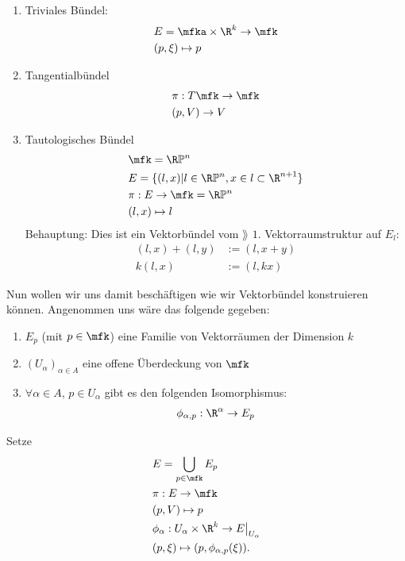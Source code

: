 \begin{bsp} \leavevmode
\begin{enumerate}
\item Triviales Bündel:
\begin{align}
&E = \mfka \times \R^k \to \mfk\\
&(p, \xi) \mapsto p
\end{align}
\item Tangentialbündel 
\begin{align}
&\pi: T\mfk \to \mfk\\
&(p, V) \to V
\end{align}
\item Tautologisches Bündel
\begin{align}
&\mfk = \R \mathbb{P}^n\\
&E = \{ (l, x) \vert l \in \R \mathbb{P}^n, x\in l \subset \R^{n+1} \}\\
&\pi: E \to \mfk = \R \mathbb{P}^n\\
&(l, x) \mapsto l
\end{align}
Behauptung: Dies ist ein Vektorbündel vom $\rang$ $1$.
Vektorraumstruktur auf $E_l$:
\begin{align}
(l, x) + (l, y) &:= (l, x + y)\\
k (l, x) &:= (l, k x)
\end{align}
\end{enumerate}
\end{bsp}
Nun wollen wir uns damit beschäftigen wie wir Vektorbündel konstruieren können.
Angenommen uns wäre das folgende gegeben:
\begin{enumerate}
\item $E_p$ (mit $p\in \mfk$) eine Familie von Vektorräumen der Dimension $k$
\item $(U_\alpha)_{\alpha \in A}$ eine offene Überdeckung von $\mfk$
\item $\forall \alpha \in A$, $p\in U_\alpha$ gibt es den folgenden Isomorphismus:
\begin{align}
\phi_{\alpha, p}: \R^\alpha \to E_p
\end{align}
\end{enumerate}
Setze 
\begin{align}
&E = \bigcup_{p \in \mfk} E_p\\
&\pi : E \to \mfk\\
&(p, V) \mapsto p\\
&\phi_\alpha: U_\alpha \times \R^k \to E \big\vert_{U_\alpha}\\
&(p, \xi) \mapsto (p, \phi_{\alpha, p}(\xi)).
\end{align}
